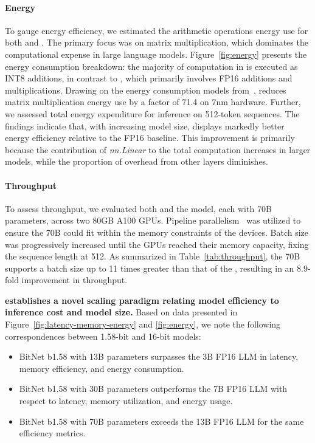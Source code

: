 \paragraph{Energy}

To gauge energy efficiency, we estimated the arithmetic operations energy use for both  and . The primary focus was on matrix multiplication, which dominates the computational expense in large language models. Figure~\ref{fig:energy} presents the energy consumption breakdown: the majority of computation in  is executed as INT8 additions, in contrast to , which primarily involves FP16 additions and multiplications. Drawing on the energy consumption models from~\cite{energycost, pokebnn},  reduces matrix multiplication energy use by a factor of 71.4 on 7nm hardware. Further, we assessed total energy expenditure for inference on 512-token sequences. The findings indicate that, with increasing model size,  displays markedly better energy efficiency relative to the FP16  baseline. This improvement is primarily because the contribution of \emph{nn.Linear} to the total computation increases in larger models, while the proportion of overhead from other layers diminishes.

\paragraph{Throughput}

To assess throughput, we evaluated both  and the  model, each with 70B parameters, across two 80GB A100 GPUs. Pipeline parallelism~\cite{gpipe} was utilized to ensure the  70B could fit within the memory constraints of the devices. Batch size was progressively increased until the GPUs reached their memory capacity, fixing the sequence length at 512. As summarized in Table~\ref{tab:throughput}, the 70B  supports a batch size up to 11 times greater than that of the , resulting in an 8.9-fold improvement in throughput.

\textbf{ establishes a novel scaling paradigm relating model efficiency to inference cost and model size.} Based on data presented in Figure~\ref{fig:latency-memory-energy} and \ref{fig:energy}, we note the following correspondences between 1.58-bit and 16-bit models:

\begin{itemize}
    \item BitNet b1.58 with 13B parameters surpasses the 3B FP16 LLM in latency, memory efficiency, and energy consumption.
    \item BitNet b1.58 with 30B parameters outperforms the 7B FP16 LLM with respect to latency, memory utilization, and energy usage.
    \item BitNet b1.58 with 70B parameters exceeds the 13B FP16 LLM for the same efficiency metrics.
\end{itemize}

